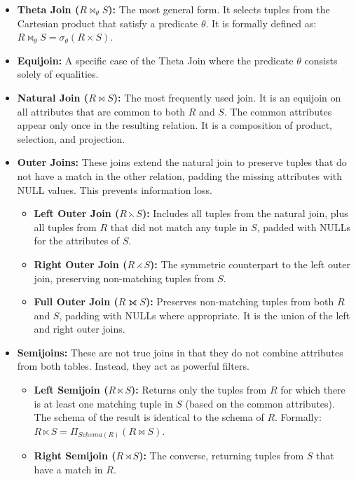 \begin{itemize}
    \item \textbf{Theta Join ($R \bowtie_{\theta} S$):} The most general form. It selects tuples from the Cartesian product that satisfy a predicate $\theta$. It is formally defined as: $R \bowtie_{\theta} S = \sigma_{\theta}(R \times S)$.
    \item \textbf{Equijoin:} A specific case of the Theta Join where the predicate $\theta$ consists solely of equalities.

    \item \textbf{Natural Join ($R \bowtie S$):} The most frequently used join. It is an equijoin on all attributes that are common to both $R$ and $S$. The common attributes appear only once in the resulting relation. It is a composition of product, selection, and projection.

    \item \textbf{Outer Joins:} These joins extend the natural join to preserve tuples that do not have a match in the other relation, padding the missing attributes with NULL values. This prevents information loss.
    \begin{itemize}
        \item \textbf{Left Outer Join ($R \leftthreetimes S$):} Includes all tuples from the natural join, plus all tuples from $R$ that did not match any tuple in $S$, padded with NULLs for the attributes of $S$.
        \item \textbf{Right Outer Join ($R \rightthreetimes S$):} The symmetric counterpart to the left outer join, preserving non-matching tuples from $S$.
        \item \textbf{Full Outer Join ($R \fullouterjoin S$):} Preserves non-matching tuples from both $R$ and $S$, padding with NULLs where appropriate. It is the union of the left and right outer joins.
    \end{itemize}

    \item \textbf{Semijoins:} These are not true joins in that they do not combine attributes from both tables. Instead, they act as powerful filters.
    \begin{itemize}
        \item \textbf{Left Semijoin ($R \ltimes S$):} Returns only the tuples from $R$ for which there is at least one matching tuple in $S$ (based on the common attributes). The schema of the result is identical to the schema of $R$. Formally: $R \ltimes S = \Pi_{Schema(R)}(R \bowtie S)$.
        \item \textbf{Right Semijoin ($R \rtimes S$):} The converse, returning tuples from $S$ that have a match in $R$.
    \end{itemize}


\end{itemize}
